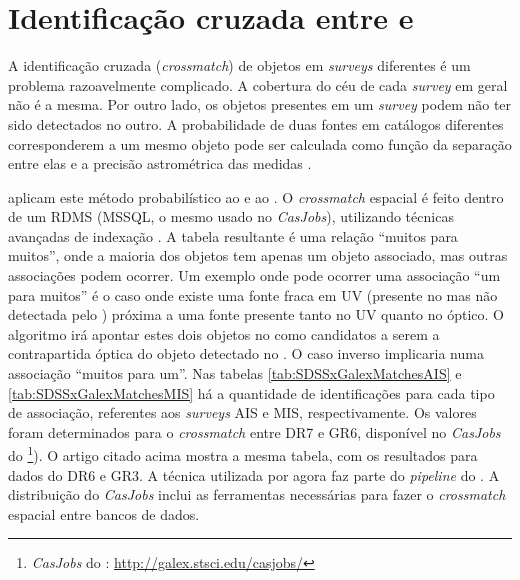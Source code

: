 
\section{Identificação cruzada entre \SDSS e \galex}
\label{sec:Crossmatch:SDSSGalex}

A identificação cruzada ({\em crossmatch}) de objetos em {\em surveys}
diferentes é um problema razoavelmente complicado. A cobertura do céu de cada
{\em survey} em geral não é a mesma. Por outro lado, os objetos presentes em um
{\em survey} podem não ter sido detectados no outro. A probabilidade de duas
fontes em catálogos diferentes corresponderem a um mesmo objeto pode ser
calculada como função da separação entre elas e a precisão astrométrica das
medidas \citep{Budavari2008}.

\citet{Budavari2009} aplicam este método probabilístico ao \SDSS e ao \galex. O
{\em crossmatch} espacial é feito dentro de um RDMS (MSSQL, o mesmo usado no
{\em CasJobs}), utilizando técnicas avançadas de indexação \citep[{\em
Hierarchic Triangular Mesh}]{Kunszt2000}. A tabela resultante é uma relação
``muitos para muitos'', onde a maioria dos objetos \galex tem apenas um objeto
\SDSS associado, mas outras associações podem ocorrer. Um exemplo onde pode
ocorrer uma associação ``um para muitos'' é o caso onde existe uma fonte fraca
em UV (presente no \SDSS mas não detectada pelo \galex) próxima a uma fonte
presente tanto no UV quanto no óptico. O algoritmo irá apontar estes dois
objetos no \SDSS como candidatos a serem a contrapartida óptica do objeto
detectado no \galex. O caso inverso implicaria numa associação ``muitos para
um''. Nas tabelas \ref{tab:SDSSxGalexMatchesAIS} e
\ref{tab:SDSSxGalexMatchesMIS} há a quantidade de identificações para cada tipo
de associação, referentes aos {\em surveys} AIS e MIS, respectivamente. Os
valores foram determinados para o {\em crossmatch} entre \SDSS DR7 e \galex GR6,
disponível no {\em CasJobs} do \galex\footnote{{\em CasJobs} do \galex:
\url{http://galex.stsci.edu/casjobs/}}). O artigo citado acima mostra a mesma
tabela, com os resultados para dados do \SDSS DR6 e \galex GR3. A técnica
utilizada por \citeauthor{Budavari2009} agora faz parte do {\em pipeline} do
\galex. A distribuição do {\em CasJobs} inclui as ferramentas necessárias para
fazer o {\em crossmatch} espacial entre bancos de dados.

